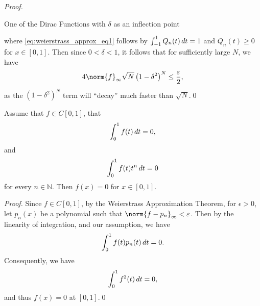 \documentclass[notoc,notitlepage]{tufte-book}
\begin{document}
\begin{proof}
\begin{marginfigure}
    \caption{One of the Dirac Functions with $\delta$ as an inflection point}\label{fig:one_of_the_dirac_functions_with_delta_as_an_inflection_point}
  \end{marginfigure}
  where \cref{eq:weierstrass_approx_eq1} follows by $\int_{-1}^{1} Q_n(t) \mathop{}\!d{t} = 1$ and $Q_n(t) \geq 0$ for $x \in [0, 1]$. Then since $0 < \delta < 1$, it follows that for sufficiently large $N$, we have
  \begin{equation*}
    4 \norm{f}_\infty \sqrt{N} \left( 1 - \delta^2 \right)^N \leq \frac{\epsilon}{2},
  \end{equation*}
  as the $\left( 1 - \delta^2 \right)^N$ term will ``decay'' much faster than $\sqrt{N}$.\qed\
\end{proof}

\begin{propo}[Moments]\label{propo:moments}
  Assume that $f \in C[0, 1]$, that
  \begin{equation*}
    \int_{0}^{1} f(t) \mathop{}\!d{t} = 0,
  \end{equation*}
  and
  \begin{equation*}
    \int_{0}^{1} f(t) t^n \mathop{}\!d{t} = 0
  \end{equation*}
  for every $n \in \mathbb{N}$. Then $f(x) = 0$ for $x \in [0, 1]$.
\end{propo}
\begin{proof}
  Since $f \in C[0, 1]$, by the Weierstrass Approximation Theorem, for $\epsilon > 0$, let $p_n(x)$ be a polynomial such that $\norm{ f - p_n }_\infty < \epsilon$. Then by the linearity of integration, and our assumption, we have
  \begin{equation*}
    \int_{0}^{1} f(t) p_n(t) \mathop{}\!d{t} = 0.
  \end{equation*}
  Consequently, we have
  \begin{equation*}
    \int_{0}^{1} f^2(t) \mathop{}\!d{t} = 0,
  \end{equation*}
  and thus $f(x) = 0$ at $[0, 1]$.\qed\
\end{proof}
\end{document}

